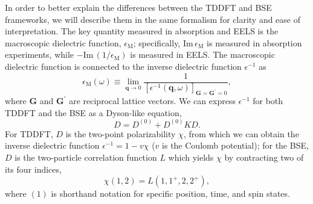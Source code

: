 \documentclass[aps,prb,10pt,showpacs,superscriptaddress,twocolumn,notitlepage]{revtex4-1}
\begin{document}
In order to better explain the differences between the TDDFT and BSE frameworks,
we will describe them in the same formalism for clarity and ease of
interpretation. The key quantity measured in absorption and EELS is the
macroscopic dielectric function, $\epsilon_{\mathrm{M}}$; specifically,
$\mathrm{Im}\,\epsilon_{\mathrm{M}}$ is measured in absorption experiments,
while $-\mathrm{Im}\,(1/\epsilon_{\mathrm{M}})$ is measured in EELS. The
macroscopic dielectric function is connected to the inverse dielectric function
$\epsilon^{-1}$ as
\begin{equation}
\epsilon_{\mathrm{M}}(\omega)\equiv
\lim_{\mathbf{q}\to 0}
\frac{1}{[\epsilon^{-1}(\mathbf{q},\omega)]_{\mathbf{G = G^{\prime}} = 0}},
\end{equation}
where $\mathbf{G}$ and $\mathbf{G^{\prime}}$ are reciprocal lattice vectors. We
can express $\epsilon^{-1}$ for both TDDFT and the BSE as a Dyson-like equation,
\begin{equation}\label{eq:dyson}
D = D^{(0)} + D^{(0)}KD.
\end{equation}
For TDDFT, $D$ is the two-point polarizability $\chi$, from which we can obtain
the inverse dielectric function $\epsilon^{-1} = 1 - v\chi$ ($v$ is the Coulomb
potential); for the BSE, $D$ is the two-particle correlation function $L$ which
yields $\chi$ by contracting two of its four indices,
\begin{equation}\label{eq:ki}
\chi(1, 2) = L(1, 1^{+}, 2, 2^{+}),
\end{equation}
where $(1)$ is shorthand notation for specific position, time, and spin states.
\end{document}
